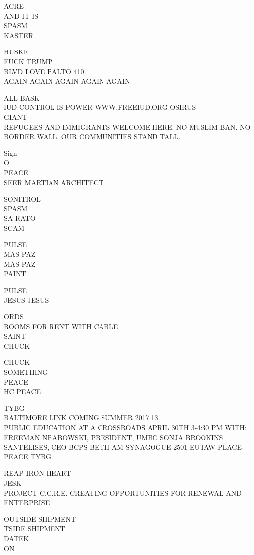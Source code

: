 \documentclass[10pt,letterpaper]{article}
\begin{document}
ACRE\\
AND IT IS\\
SPASM\\
KASTER

HUSKE\\
FUCK TRUMP\\
BLVD LOVE BALTO 410\\
AGAIN AGAIN AGAIN AGAIN AGAIN

ALL BASK\\
IUD CONTROL IS POWER WWW.FREEIUD.ORG OSIRUS\\
GIANT\\
REFUGEES AND IMMIGRANTS WELCOME HERE.  NO MUSLIM BAN.  NO BORDER WALL.  OUR COMMUNITIES STAND TALL.

Sign\\
O\\
PEACE\\
SEER MARTIAN ARCHITECT

SONITROL\\
SPASM\\
SA RATO\\
SCAM

PULSE\\
MAS PAZ\\
MAS PAZ\\
PAINT

PULSE\\
JESUS JESUS

ORDS\\
ROOMS FOR RENT WITH CABLE\\
SAINT\\
CHUCK

CHUCK\\
SOMETHING\\
PEACE\\
HC PEACE

TYBG\\
BALTIMORE LINK COMING SUMMER 2017 13\\
PUBLIC EDUCATION AT A CROSSROADS APRIL 30TH 3{-}4:30 PM WITH: FREEMAN NRABOWSKI, PRESIDENT, UMBC SONJA BROOKINS SANTELISES, CEO BCPS BETH AM SYNAGOGUE 2501 EUTAW PLACE\\
PEACE TYBG

REAP IRON HEART\\
JESK\\
PROJECT C.O.R.E. CREATING OPPORTUNITIES FOR RENEWAL AND ENTERPRISE

OUTSIDE SHIPMENT\\
TSIDE SHIPMENT\\
DATEK\\
ON
\end{document}
